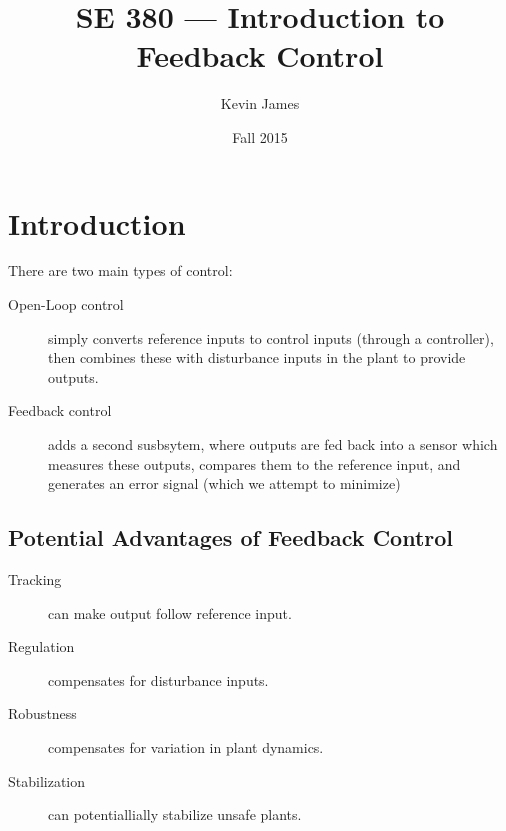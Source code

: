 \documentclass[12pt]{article}
\begin{document}
\title{SE 380 --- Introduction to Feedback Control}
\author{Kevin James}
\date{\vspace{-2ex}Fall 2015}
\maketitle\HRule

\tableofcontents
\newpage

\section{Introduction}
There are two main types of control:
\begin{description}
\item[Open-Loop control] simply converts reference inputs to control inputs (through a controller), then combines these with disturbance inputs in the plant to provide outputs.
\item[Feedback control] adds a second susbsytem, where outputs are fed back into a sensor which measures these outputs, compares them to the reference input, and generates an error signal (which we attempt to minimize)
\end{description}

\subsection{Potential Advantages of Feedback Control}
\begin{description}
\item[Tracking] can make output follow reference input.
\item[Regulation] compensates for disturbance inputs.
\item[Robustness] compensates for variation in plant dynamics.
\item[Stabilization] can potentiallially stabilize unsafe plants.
\end{description}
\end{document}
